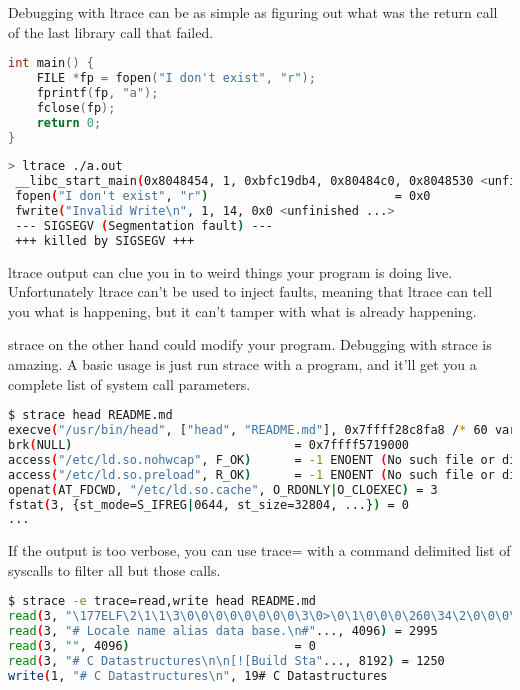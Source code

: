 Debugging with ltrace can be as simple as figuring out what was the return call of the last library call that failed.

\begin{lstlisting}[language=C]
int main() {
    FILE *fp = fopen("I don't exist", "r");
    fprintf(fp, "a");
    fclose(fp);
    return 0;
}
\end{lstlisting}

\begin{lstlisting}[language=bash]
> ltrace ./a.out
 __libc_start_main(0x8048454, 1, 0xbfc19db4, 0x80484c0, 0x8048530 <unfinished ...>
 fopen("I don't exist", "r")                          = 0x0
 fwrite("Invalid Write\n", 1, 14, 0x0 <unfinished ...>
 --- SIGSEGV (Segmentation fault) ---
 +++ killed by SIGSEGV +++

\end{lstlisting}

ltrace output can clue you in to weird things your program is doing live.
Unfortunately ltrace can’t be used to inject faults, meaning that ltrace can tell you what is happening, but it can't tamper with what is already happening.

strace on the other hand could modify your program.
Debugging with strace is amazing.
A basic usage is just run strace with a program, and it’ll get you a complete list of system call parameters.

\begin{lstlisting}[language=bash]
$ strace head README.md
execve("/usr/bin/head", ["head", "README.md"], 0x7ffff28c8fa8 /* 60 vars */) = 0
brk(NULL)                               = 0x7ffff5719000
access("/etc/ld.so.nohwcap", F_OK)      = -1 ENOENT (No such file or directory)
access("/etc/ld.so.preload", R_OK)      = -1 ENOENT (No such file or directory)
openat(AT_FDCWD, "/etc/ld.so.cache", O_RDONLY|O_CLOEXEC) = 3
fstat(3, {st_mode=S_IFREG|0644, st_size=32804, ...}) = 0
...
\end{lstlisting}

If the output is too verbose, you can use trace= with a command delimited list of syscalls to filter all but those calls.

\begin{lstlisting}[language=bash]
$ strace -e trace=read,write head README.md
read(3, "\177ELF\2\1\1\3\0\0\0\0\0\0\0\0\3\0>\0\1\0\0\0\260\34\2\0\0\0\0\0"..., 832) = 832
read(3, "# Locale name alias data base.\n#"..., 4096) = 2995
read(3, "", 4096)                       = 0
read(3, "# C Datastructures\n\n[![Build Sta"..., 8192) = 1250
write(1, "# C Datastructures\n", 19# C Datastructures
\end{lstlisting}

